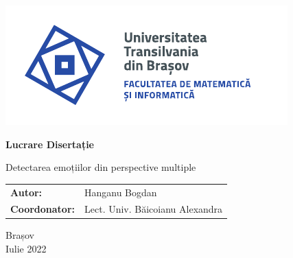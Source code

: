 \begin{titlepage}
	
	\vspace*{-3cm}
	\hspace{-2cm}
	\includegraphics[width=0.8\linewidth]{./images/Logo-UT-MI-SPOT-RO}
	
	\begin{center}
		\Huge
		
		\vspace{2cm}
		
		\textbf{Lucrare Disertație}
		
		\vspace{1cm} 
		
		\LARGE Detectarea emoțiilor din perspective multiple
		
		\vfill
		
		\Large
		\begin{tabular}{ll}
			\textbf{Autor:}&Hanganu Bogdan\\
			\textbf{Coordonator:}&Lect. Univ. Băicoianu Alexandra
		\end{tabular}
		
		\vfill
		
		\Large
		Brașov\\
		Iulie 2022
		
	\end{center}
\end{titlepage}